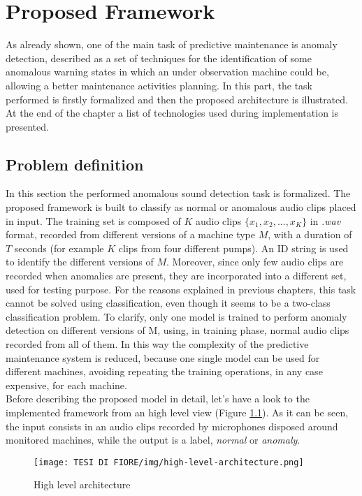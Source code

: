\chapter{Proposed Framework}
As already shown, one of the main task of predictive maintenance is anomaly detection, described as a set of techniques for the identification of some anomalous warning states in which an under observation machine could be, allowing a better maintenance activities planning. In this part, the task performed is firstly formalized and then the proposed architecture is illustrated. At the end of the chapter a list of technologies used during implementation is presented.
\section{Problem definition}
In this section the performed anomalous sound detection task is formalized. The proposed framework is built to classify as normal or anomalous audio clips placed in input. The training set is composed of $K$ audio clips $\{x_1, x_2, ...,x_K\}$ in \textit{.wav} format, recorded from different versions of a machine type $M$, with a duration of $T$ seconds (for example $K$ clips from four different pumps). An ID string is used to identify the different versions of $M$. Moreover, since only few audio clips are recorded when anomalies are present, they are incorporated into a different set, used for testing purpose. For the reasons explained in previous chapters, this task cannot be solved using classification, even though it seems to be a two-class classification problem. To clarify, only one model is trained to perform anomaly detection on different versions of M, using, in training phase, normal audio clips recorded from all of them. In this way the complexity of the predictive maintenance system is reduced, because one single model can be used for different machines, avoiding repeating the training operations, in any case expensive, for each machine.\\
Before describing the proposed model in detail, let’s have a look to the implemented framework from an high level view (Figure \ref{high-level-architecture}). As it can be seen, the input consists in an audio clips recorded by microphones disposed around monitored machines, while the output is a label, \textit{normal} or \textit{anomaly}.
\begin{figure}[ht]
\texttt{[image: TESI DI FIORE/img/high-level-architecture.png]}
\centering
\caption{High level architecture \cite{DCASE}}
\label{high-level-architecture}
\end{figure}


